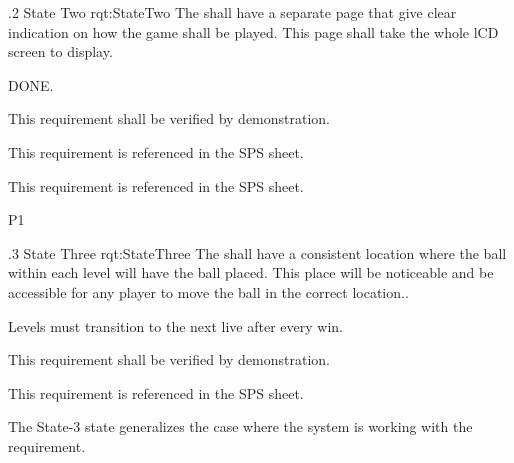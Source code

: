 \ONERQMTVKSA
{\RqtNumberBase.2}
{State Two}
{rqt:StateTwo}
{The \ThisSys shall have a separate page that give clear indication on how the game shall be played. This page shall take the whole lCD screen to display.}
{
	\item [Phase 1] DONE.
}
{This requirement shall be verified by demonstration.}
{
	\item [SPS] This requirement is referenced in the SPS sheet.
}
{
	\item [N/A] This requirement is referenced in the SPS sheet.
}
{P1}


\ONERQMTV
{\RqtNumberBase.3}
{State Three}
{rqt:StateThree}
{The \ThisSys shall have a consistent location where the ball within each level will have the ball placed. This place will be noticeable and be accessible for any player to move the ball in the correct location..}
{
	\item [Phase 1] Levels must transition to the next live after every win.
}
{This requirement shall be verified by demonstration.}
{
	\item [SPS] This requirement is referenced in the SPS sheet.
}
{
	\item The State-3 state generalizes the case where the system is working with the requirement.
}


